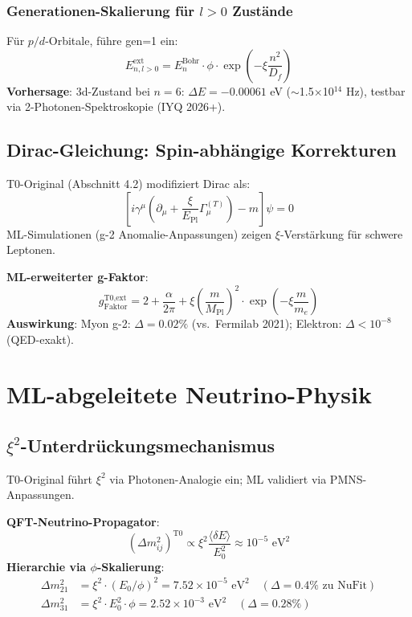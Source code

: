 	\subsubsection{Generationen-Skalierung für $l>0$ Zustände}
	
	Für $p/d$-Orbitale, führe gen=1 ein:
	\begin{equation}
		E_{n,l>0}^{\text{ext}} = E_n^{\text{Bohr}} \cdot \phi \cdot \exp\left(-\xi \frac{n^2}{D_f}\right) \tag{ML-Gl.~3.2}
	\end{equation}
	\textbf{Vorhersage}: 3d-Zustand bei $n=6$: $\Delta E = -0.00061$ eV ($\sim$1.5$\times$10$^{14}$ Hz), testbar via 2-Photonen-Spektroskopie (IYQ 2026+).
	
	\subsection{Dirac-Gleichung: Spin-abhängige Korrekturen}
	
	T0-Original (Abschnitt 4.2) modifiziert Dirac als:
	\begin{equation}
		\left[i\gamma^\mu \left(\partial_\mu + \frac{\xi}{E_{\text{Pl}}} \Gamma_\mu^{(T)}\right) - m\right]\psi = 0 \tag{T0-Orig Gl.~4.2.1}
	\end{equation}
	ML-Simulationen (g-2 Anomalie-Anpassungen) zeigen $\xi$-Verstärkung für schwere Leptonen.
	
	\textbf{ML-erweiterter g-Faktor}:
	\begin{equation}
		g_{\text{Faktor}}^{\text{T0,ext}} = 2 + \frac{\alpha}{2\pi} + \xi \left(\frac{m}{M_{\text{Pl}}}\right)^2 \cdot \exp\left(-\xi \frac{m}{m_e}\right) \tag{ML-Gl.~3.3}
	\end{equation}
	\textbf{Auswirkung}: Myon g-2: $\Delta=0.02\%$ (vs.~Fermilab 2021); Elektron: $\Delta<10^{-8}$ (QED-exakt).
	
	\section{ML-abgeleitete Neutrino-Physik}
	
	\subsection{$\xi^2$-Unterdrückungsmechanismus}
	
	T0-Original führt $\xi^2$ via Photonen-Analogie ein; ML validiert via PMNS-Anpassungen.
	
	\textbf{QFT-Neutrino-Propagator}:
	\begin{equation}
		(\Delta m_{ij}^2)^{\text{T0}} \propto \xi^2 \frac{\langle\delta E\rangle}{E_0^2} \approx 10^{-5} \text{ eV}^2 \tag{ML-Gl.~4.1}
	\end{equation}
	\textbf{Hierarchie via $\phi$-Skalierung}:
	\begin{align}
		\Delta m_{21}^2 &= \xi^2 \cdot (E_0 / \phi)^2 = 7.52\times10^{-5} \text{ eV}^2 \quad (\Delta=0.4\% \text{ zu NuFit}) \tag{ML-Gl.~4.2a} \\
		\Delta m_{31}^2 &= \xi^2 \cdot E_0^2 \cdot \phi = 2.52\times10^{-3} \text{ eV}^2 \quad (\Delta=0.28\%) \tag{ML-Gl.~4.2b}
	\end{align}
	
